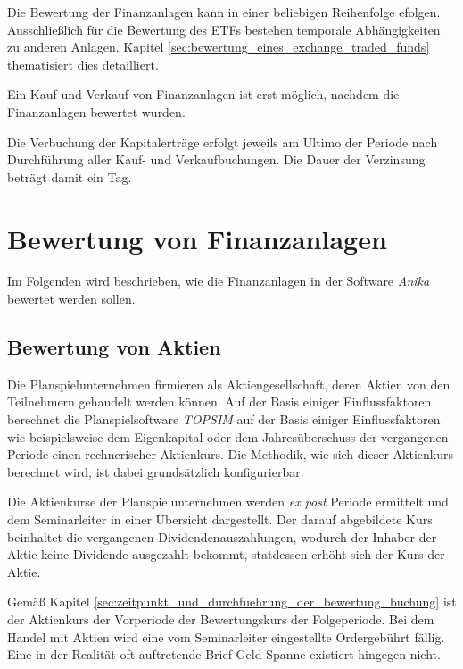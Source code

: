 \documentclass[12pt, a4paper]{article}
\theoremstyle{plain}
\begin{document}
Die Bewertung der Finanzanlagen kann in einer beliebigen Reihenfolge efolgen.
Ausschließlich für die Bewertung des \glspl{ETF} bestehen temporale Abhängigkeiten zu anderen Anlagen. Kapitel \ref{sec:bewertung_eines_exchange_traded_funds} thematisiert dies detailliert.

Ein Kauf und Verkauf von Finanzanlagen ist erst möglich, nachdem die Finanzanlagen bewertet wurden.

Die Verbuchung der Kapitalerträge erfolgt jeweils am Ultimo der Periode nach Durchführung aller Kauf- und Verkaufbuchungen.
Die Dauer der Verzinsung beträgt damit ein Tag.

\section{Bewertung von Finanzanlagen}
\label{sec:bewertung_von_finanzanlagen}
Im Folgenden wird beschrieben, wie die Finanzanlagen in der Software \textit{Anika} bewertet werden sollen.

\subsection{Bewertung von Aktien}
\label{sec:bewertung_von_aktien}
Die Planspielunternehmen firmieren als Aktiengesellschaft, deren Aktien von den Teilnehmern gehandelt werden können.
Auf der Basis einiger Einflussfaktoren berechnet die Planspielsoftware \textit{TOPSIM} auf der Basis einiger Einflussfaktoren wie beispielsweise dem Eigenkapital oder dem Jahresüberschuss der vergangenen Periode einen rechnerischer Aktienkurs.
Die Methodik, wie sich dieser Aktienkurs berechnet wird, ist dabei grundsätzlich konfigurierbar.

Die Aktienkurse der Planspielunternehmen werden \textit{ex post} Periode ermittelt und dem Seminarleiter in einer Übersicht dargestellt. Der darauf abgebildete Kurs beinhaltet die vergangenen Dividendenauszahlungen, wodurch der Inhaber der Aktie keine Dividende ausgezahlt bekommt, statdessen erhöht sich der Kurs der Aktie.

Gemäß Kapitel \ref{sec:zeitpunkt_und_durchfuehrung_der_bewertung_buchung} ist der Aktienkurs der Vorperiode der Bewertungskurs der Folgeperiode.
Bei dem Handel mit Aktien wird eine vom Seminarleiter eingestellte Ordergebührt fällig. Eine in der Realität oft auftretende Brief-Geld-Spanne existiert hingegen nicht.

\end{document}
